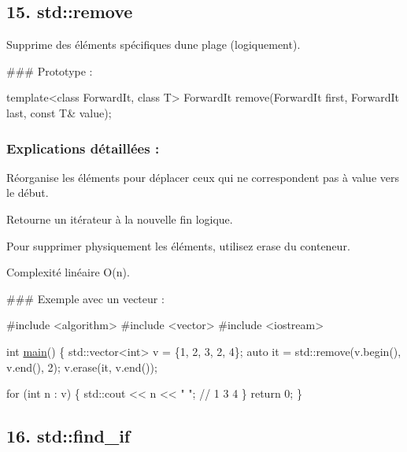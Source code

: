 \subsection*{15. {\bfseries std\+::remove}}

Supprime des éléments spécifiques d\textquotesingle{}une plage (logiquement).

\#\#\# Prototype \+: 
\begin{DoxyCode}
\textcolor{keyword}{template}<\textcolor{keyword}{class} ForwardIt, \textcolor{keyword}{class} T>
ForwardIt \textcolor{keyword}{remove}(ForwardIt first, ForwardIt last, \textcolor{keyword}{const} T& value);
\end{DoxyCode}


\subsubsection*{Explications détaillées \+:}


\begin{DoxyItemize}
\item Réorganise les éléments pour déplacer ceux qui ne correspondent pas à {\ttfamily value} vers le début.
\item Retourne un itérateur à la nouvelle fin logique.
\item Pour supprimer physiquement les éléments, utilisez {\ttfamily erase} du conteneur.
\item Complexité linéaire O(n).
\end{DoxyItemize}

\#\#\# Exemple avec un vecteur \+: 
\begin{DoxyCode}
\textcolor{preprocessor}{#include <algorithm>}
\textcolor{preprocessor}{#include <vector>}
\textcolor{preprocessor}{#include <iostream>}

\textcolor{keywordtype}{int} \hyperlink{htop_8c_a3c04138a5bfe5d72780bb7e82a18e627}{main}() \{
    std::vector<int> v = \{1, 2, 3, 2, 4\};
    \textcolor{keyword}{auto} it = std::remove(v.begin(), v.end(), 2);
    v.erase(it, v.end());

    \textcolor{keywordflow}{for} (\textcolor{keywordtype}{int} n : v) \{
        std::cout << n << \textcolor{stringliteral}{" "}; \textcolor{comment}{// 1 3 4}
    \}
    \textcolor{keywordflow}{return} 0;
\}
\end{DoxyCode}
 



\subsection*{16. {\bfseries std\+::find\+\_\+if}}

